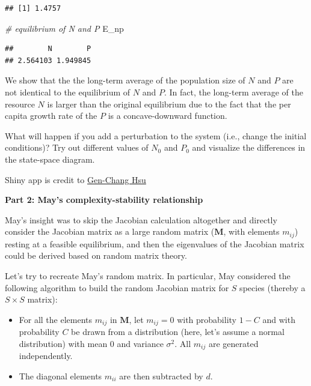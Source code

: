 \documentclass[
]{book}
\newenvironment{Shaded}{\begin{snugshade}}{\end{snugshade}}
\newcommand{\CommentTok}[1]{\textcolor[rgb]{0.56,0.35,0.01}{\textit{#1}}}
\newcommand{\NormalTok}[1]{#1}
\begin{document}
\begin{verbatim}
## [1] 1.4757
\end{verbatim}

\begin{Shaded}
\begin{Highlighting}[]
\CommentTok{# equilibrium of N and P}
\NormalTok{E_np}
\end{Highlighting}
\end{Shaded}

\begin{verbatim}
##        N        P 
## 2.564103 1.949845
\end{verbatim}

We show that the the long-term average of the population size of \(N\) and \(P\) are not identical to the equilibrium of \(N\) and \(P\). In fact, the long-term average of the resource \(N\) is larger than the original equilibrium due to the fact that the per capita growth rate of the \(P\) is a concave-downward function.

What will happen if you add a perturbation to the system (i.e., change the initial conditions)? Try out different values of \(N_0\) and \(P_0\) and visualize the differences in the state-space diagram.

Shiny app is credit to \href{https://genchanghsu.github.io/index.html}{Gen-Chang Hsu}

\textbf{Part 2: May's complexity-stability relationship}

May's insight was to skip the Jacobian calculation altogether and directly consider the Jacobian matrix as a large random matrix (\(\mathbf{M}\), with elements \(m_{ij}\)) resting at a feasible equilibrium, and then the eigenvalues of the Jacobian matrix could be derived based on random matrix theory.

Let's try to recreate May's random matrix. In particular, May considered the following algorithm to build the random Jacobian matrix for \(S\) species (thereby a \(S \times S\) matrix):

\begin{itemize}
    \item For all the elements $m_{ij}$ in $\mathbf{M}$, let $m_{ij} = 0$ with probability $1-C$ and with probability $C$ be drawn from a distribution (here, let's assume a normal distribution) with mean 0 and variance $\sigma^{2}$. All $m_{ij}$ are generated independently.
    \item The diagonal elements $m_{ii}$ are then subtracted by $d$. 
\end{itemize}
\end{document}
